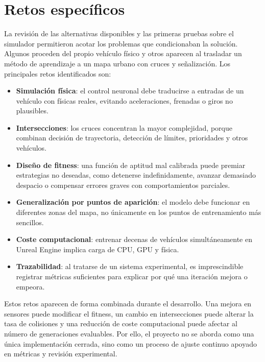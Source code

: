 \clearpage
\section{Retos específicos}

La revisión de las alternativas disponibles y las primeras pruebas sobre el simulador permitieron acotar los problemas que condicionaban la solución. Algunos proceden del propio vehículo físico y otros aparecen al trasladar un método de aprendizaje a un mapa urbano con cruces y señalización. Los principales retos identificados son:

\begin{itemize}[leftmargin=*]
  \item \textbf{Simulación física}: el control neuronal debe traducirse a entradas de un vehículo con físicas reales, evitando aceleraciones, frenadas o giros no plausibles.
  \item \textbf{Intersecciones}: los cruces concentran la mayor complejidad, porque combinan decisión de trayectoria, detección de límites, prioridades y otros vehículos.
  \item \textbf{Diseño de fitness}: una función de aptitud mal calibrada puede premiar estrategias no deseadas, como detenerse indefinidamente, avanzar demasiado despacio o compensar errores graves con comportamientos parciales.
  \item \textbf{Generalización por puntos de aparición}: el modelo debe funcionar en diferentes zonas del mapa, no únicamente en los puntos de entrenamiento más sencillos.
  \item \textbf{Coste computacional}: entrenar decenas de vehículos simultáneamente en Unreal Engine implica carga de CPU, GPU y física.
  \item \textbf{Trazabilidad}: al tratarse de un sistema experimental, es imprescindible registrar métricas suficientes para explicar por qué una iteración mejora o empeora.
\end{itemize}

Estos retos aparecen de forma combinada durante el desarrollo. Una mejora en sensores puede modificar el fitness, un cambio en intersecciones puede alterar la tasa de colisiones y una reducción de coste computacional puede afectar al número de generaciones evaluables. Por ello, el proyecto no se aborda como una única implementación cerrada, sino como un proceso de ajuste continuo apoyado en métricas y revisión experimental.
